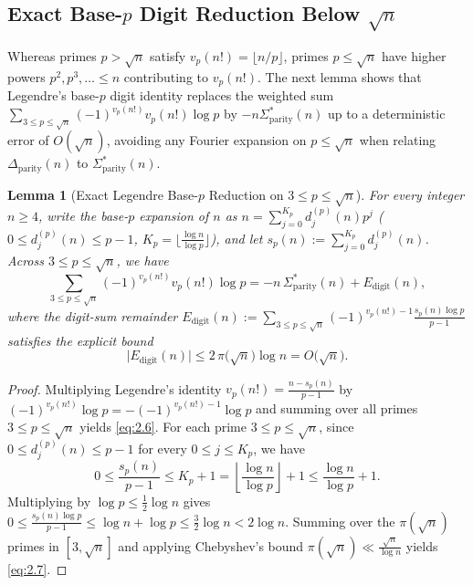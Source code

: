 \documentclass[11pt,reqno]{amsart}
\newtheorem{lemma}[theorem]{Lemma}
\theoremstyle{remark}
\numberwithin{equation}{section}
\newcommand{\Dparity}{\Delta_{\mathrm{parity}}}
\newcommand{\Sparitys}{\Sigma_{\mathrm{parity}}^*}
\begin{document}
\subsection{Exact Base-$p$ Digit Reduction Below $\sqrt{n}$}
Whereas primes $p > \sqrt{n}$ satisfy $v_p(n!) = \lfloor n/p \rfloor$, primes $p \le \sqrt{n}$ have higher powers $p^2, p^3, \dots \le n$ contributing to $v_p(n!)$. The next lemma shows that Legendre's base-$p$ digit identity replaces the weighted sum $\sum_{3 \le p \le \sqrt{n}} (-1)^{v_p(n!)} v_p(n!)\log p$ by $-n\Sparitys(n)$ up to a deterministic error of $O(\sqrt{n})$, avoiding any Fourier expansion on $p \le \sqrt{n}$ when relating $\Dparity(n)$ to $\Sparitys(n)$.

\begin{lemma}[{Exact Legendre Base-$p$ Reduction on $3 \le p \le \sqrt{n}$}]\label{lem:2.2}
For every integer $n \ge 4$, write the base-$p$ expansion of $n$ as $n = \sum_{j=0}^{K_p} d_j^{(p)}(n)p^j$ ($0 \le d_j^{(p)}(n) \le p - 1$, $K_p = \lfloor \frac{\log n}{\log p} \rfloor$), and let $s_p(n) := \sum_{j=0}^{K_p} d_j^{(p)}(n)$. Across $3 \le p \le \sqrt{n}$, we have
\begin{equation}\label{eq:2.6}
\sum_{3 \le p \le \sqrt{n}} (-1)^{v_p(n!)} v_p(n!)\log p = -n\,\Sparitys(n) + E_{\mathrm{digit}}(n),
\end{equation}
where the digit-sum remainder $E_{\mathrm{digit}}(n) := \sum_{3 \le p \le \sqrt{n}} (-1)^{v_p(n!)-1} \frac{s_p(n)\log p}{p - 1}$ satisfies the explicit bound
\begin{equation}\label{eq:2.7}
\bigl|E_{\mathrm{digit}}(n)\bigr| \le 2\,\pi\bigl(\sqrt{n}\bigr)\log n = O\bigl(\sqrt{n}\bigr).
\end{equation}
\end{lemma}

\begin{proof}
Multiplying Legendre's identity $v_p(n!) = \frac{n - s_p(n)}{p - 1}$ by $(-1)^{v_p(n!)}\log p = -(-1)^{v_p(n!)-1}\log p$ and summing over all primes $3 \le p \le \sqrt{n}$ yields \eqref{eq:2.6}. For each prime $3 \le p \le \sqrt{n}$, since $0 \le d_j^{(p)}(n) \le p - 1$ for every $0 \le j \le K_p$, we have
\[
0 \le \frac{s_p(n)}{p - 1} \le K_p + 1 = \left\lfloor \frac{\log n}{\log p} \right\rfloor + 1 \le \frac{\log n}{\log p} + 1.
\]
Multiplying by $\log p \le \frac{1}{2}\log n$ gives $0 \le \frac{s_p(n)\log p}{p - 1} \le \log n + \log p \le \frac{3}{2}\log n < 2\log n$. Summing over the $\pi(\sqrt{n})$ primes in $[3, \sqrt{n}]$ and applying Chebyshev's bound $\pi(\sqrt{n}) \ll \frac{\sqrt{n}}{\log n}$ yields \eqref{eq:2.7}.
\end{proof}
\end{document}
